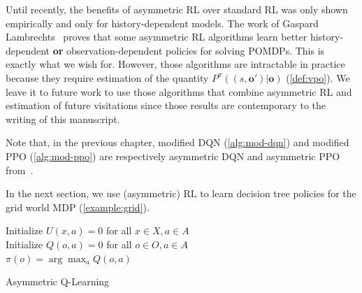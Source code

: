 Until recently, the benefits of asymmetric RL over standard RL was only shown empirically and only for history-dependent models.
The work of Gaspard Lambrechts~\cite{justif-asym} proves that some asymmetric RL algorithms learn better history-dependent \textbf{or} observation-dependent policies for solving POMDPs.
This is exactly what we wish for. However, those algorithms are intractable in practice because they require estimation of the quantity $P^{\pi}((s, \boldsymbol{o}')|\boldsymbol{o})$ (\ref{def:vpo}).
We leave it to future work to use those algorithms that combine asymmetric RL and estimation of future visitations since those results are contemporary to the writing of this manuscript.

Note that, in the previous chapter, modified DQN (\ref{alg:mod-dqn}) and modified PPO (\ref{alg:mod-ppo}) are respectively asymmetric DQN and asymmetric PPO from~\cite{baisero-dqn,baisero-ppo}.

In the next section, we use (asymmetric) RL to learn decision tree policies for the grid world MDP (\ref{example:grid}).

\begin{algorithm}
    Initialize $U(x,a) = 0$ for all $x \in X, a \in A$ \\
    Initialize $Q(o,a) = 0$ for all $o \in O, a \in A$ \\

    $\pi(o) = \arg\max_a Q(o,a)$ 
    \caption{Asymmetric Q-Learning}\label{alg:asymqlearning}
\end{algorithm}


